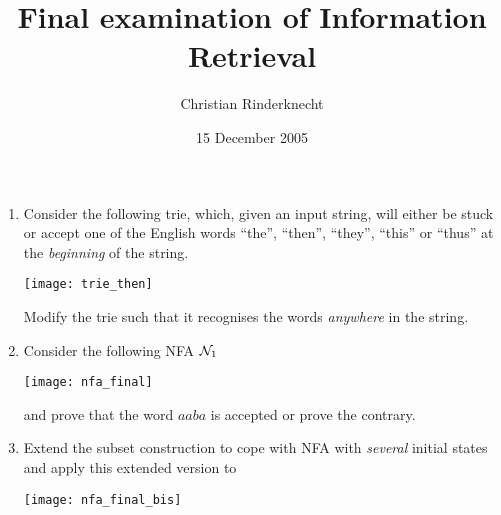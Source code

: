 \documentclass[11pt]{article}
\title{Final examination of Information Retrieval}
\author{Christian Rinderknecht}
\date{15 December 2005}
\begin{document}
\maketitle

\begin{enumerate}

  \item Consider the following trie, which, given an input string,
    will either be stuck or accept one of the English words ``the'',
    ``then'', ``they'', ``this'' or ``thus'' at the \emph{beginning}
    of the string.
  \begin{multicols}{2}
  \begin{center}
  \texttt{[image: trie\_then]}
  \end{center}
  \par \vfill\columnbreak
  Modify the trie such that it recognises the words \emph{anywhere}
  in the string.
  \end{multicols}

  \item Consider the following NFA \({\cal N}_1\)
  \begin{center}
  \texttt{[image: nfa\_final]}
  \end{center}
    
    and prove that the word \(aaba\) is accepted or prove the
    contrary.

  \item Extend the subset construction to cope with NFA with
    \emph{several} initial states and apply this extended version to
   \begin{center}
   \texttt{[image: nfa\_final\_bis]}
   \end{center}

\end{enumerate}
\end{document}
